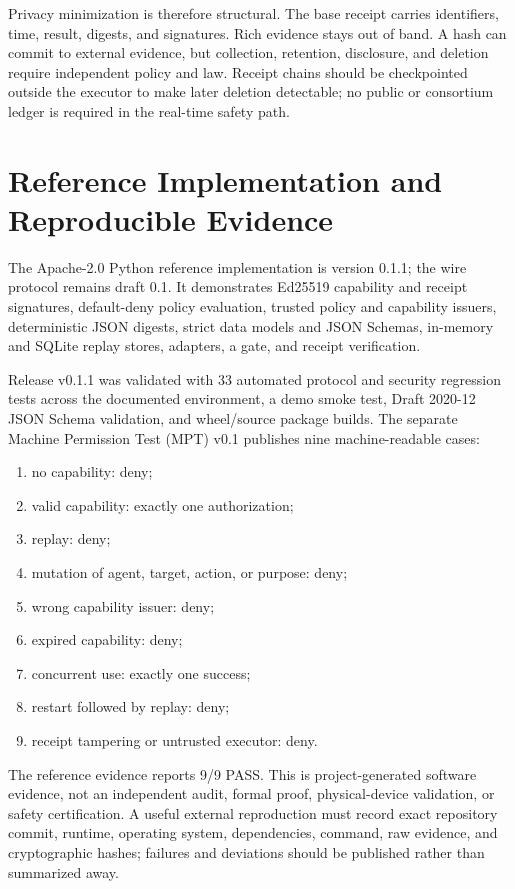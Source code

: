 \documentclass[10.5pt,a4paper]{article}
\begin{document}
Privacy minimization is therefore structural. The base receipt carries identifiers, time,
result, digests, and signatures. Rich evidence stays out of band. A hash can commit to external
evidence, but collection, retention, disclosure, and deletion require independent policy and law.
Receipt chains should be checkpointed outside the executor to make later deletion detectable;
no public or consortium ledger is required in the real-time safety path.

\section{Reference Implementation and Reproducible Evidence}

The Apache-2.0 Python reference implementation is version 0.1.1; the wire protocol remains draft
0.1. It demonstrates Ed25519 capability and receipt signatures, default-deny policy evaluation,
trusted policy and capability issuers, deterministic JSON digests, strict data models and JSON
Schemas, in-memory and SQLite replay stores, adapters, a gate, and receipt verification.

Release v0.1.1 was validated with 33 automated protocol and security regression tests across the
documented environment, a demo smoke test, Draft 2020-12 JSON Schema validation, and wheel/source
package builds\cite{jsonschema}. The separate Machine Permission Test (MPT) v0.1 publishes nine machine-readable
cases:

\begin{enumerate}
  \item no capability: deny;
  \item valid capability: exactly one authorization;
  \item replay: deny;
  \item mutation of agent, target, action, or purpose: deny;
  \item wrong capability issuer: deny;
  \item expired capability: deny;
  \item concurrent use: exactly one success;
  \item restart followed by replay: deny;
  \item receipt tampering or untrusted executor: deny.
\end{enumerate}

The reference evidence reports 9/9 PASS. This is project-generated software evidence, not an
independent audit, formal proof, physical-device validation, or safety certification. A useful
external reproduction must record exact repository commit, runtime, operating system,
dependencies, command, raw evidence, and cryptographic hashes; failures and deviations should be
published rather than summarized away.
\end{document}
